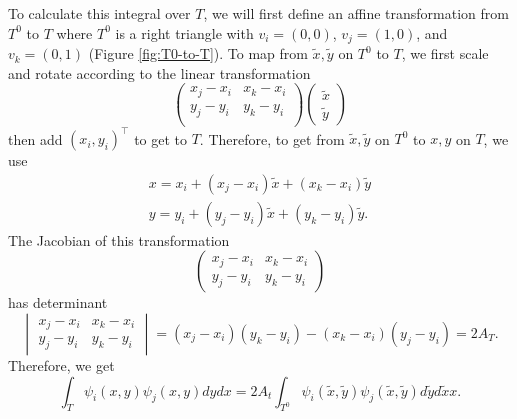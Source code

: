 To calculate this integral over $T$, we will first define an affine transformation from $T^0$ to $T$ where $T^0$ is a right triangle with $v_i = (0, 0)$, $v_j = (1, 0)$, and $v_k = (0, 1)$ (Figure \ref{fig:T0-to-T}). To map from $\tilde{x}, \tilde{y}$ on $T^0$ to $T$, we first scale and rotate according to the linear transformation
\[
    \begin{pmatrix}
        x_j - x_i & x_k - x_i \\
        y_j - y_i & y_k - y_i \\
    \end{pmatrix} \begin{pmatrix}
        \tilde{x} \\ \tilde{y}
    \end{pmatrix}
\]
then add $(x_i, y_i)^\top$ to get to $T$. Therefore, to get from $\tilde{x}, \tilde{y}$ on $T^0$ to $x, y$ on $T$, we use
\begin{align*}
    x = x_i + (x_j - x_i) \tilde{x} + (x_k - x_i) \tilde{y} \\
    y = y_i + (y_j - y_i) \tilde{x} + (y_k - y_i) \tilde{y}.
\end{align*}
The Jacobian of this transformation
\[
    \begin{pmatrix}
        x_j - x_i & x_k - x_i \\
        y_j - y_i & y_k - y_i
    \end{pmatrix}
\]
has determinant
\[
    \begin{vmatrix}
        x_j - x_i & x_k - x_i \\
        y_j - y_i & y_k - y_i
    \end{vmatrix} = (x_j - x_i)(y_k - y_i) - (x_k - x_i)(y_j - y_i) = 2 A_T.
\]
Therefore, we get
\[
    \int_T \psi_i(x, y) \psi_j(x, y) dydx = 2 A_t \int_{T^0} \psi_i(\tilde{x}, \tilde{y}) \psi_j(\tilde{x}, \tilde{y}) d\tilde{y}d\tilde{x}x.
\]


